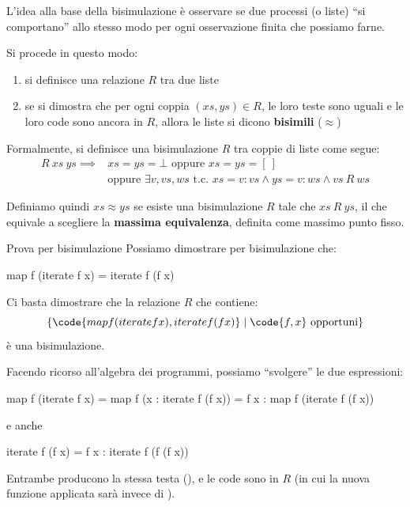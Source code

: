 L'idea alla base della bisimulazione è osservare se due processi (o liste) ``si comportano'' allo stesso modo per ogni osservazione finita che possiamo farne.

Si procede in questo modo:
\begin{enumerate}
    \item si definisce una relazione $R$ tra due liste
    \item se si dimostra che per ogni coppia $(xs, ys) \in R$, le loro teste sono uguali e le loro code sono ancora in $R$, allora le liste si dicono \textbf{bisimili} ($\approx$)
\end{enumerate}

Formalmente, si definisce una bisimulazione $R$ tra coppie di liste come segue:
\begin{align*}
    R \ xs \ ys \implies & xs = ys = \bot \text{ oppure } xs = ys = [ \ ] \\
                         & \text{oppure } \exists v, vs, ws \text{ t.c. } xs = v:vs \land ys = v:ws \land vs \ R \ ws
\end{align*}

Definiamo quindi $xs \approx ys$ se esiste una bisimulazione $R$ tale che $xs \ R \ ys$, il che equivale a scegliere la \textbf{massima equivalenza}, definita come massimo punto fisso.

\begin{gframe}{Prova per bisimulazione}
    Possiamo dimostrare per bisimulazione che:
    \begin{haskellbox}{}
map f (iterate f x) = iterate f (f x)
    \end{haskellbox}
    Ci basta dimostrare che la relazione $R$ che contiene:
    $$\{ \code{map f (iterate f x), iterate f (f x)} \mid \code{f,x} \text{ opportuni} \}$$
    è una bisimulazione.

    Facendo ricorso all'algebra dei programmi, possiamo ``svolgere'' le due espressioni:
    \begin{haskellbox}{}
map f (iterate f x) = map f (x : iterate f (f x))
                    = f x : map f (iterate f (f x))

    \end{haskellbox}
e anche
    \begin{haskellbox}{}
iterate f (f x) = f x : iterate f (f (f x))
    \end{haskellbox}

    Entrambe producono la stessa testa (), e le code sono in $R$ (in cui la nuova funzione applicata sarà  invece di ).
\end{gframe}

